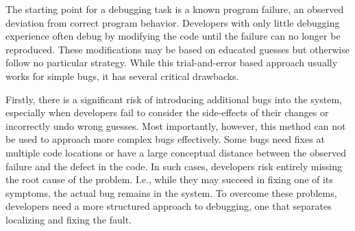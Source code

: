 The starting point for a debugging task is a known program failure, an observed deviation from correct program behavior.
Developers with only little debugging experience often debug by modifying the code until the failure can no longer be reproduced.
These modifications may be based on educated guesses but otherwise follow no particular strategy.
While this trial-and-error based approach usually works for simple bugs, it has several critical drawbacks.

Firstly, there is a significant risk of introducing additional bugs into the system, especially when developers fail to consider the side-effects of their changes or incorrectly undo wrong guesses.
Most importantly, however, this method can not be used to approach more complex bugs effectively.
Some bugs need fixes at multiple code locations or have a large conceptual distance between the observed failure and the defect in the code.
In such cases, developers risk entirely missing the root cause of the problem.
I.e., while they may succeed in fixing one of its symptoms, the actual bug remains in the system.
To overcome these problems, developers need a more structured approach to debugging, one that separates localizing and fixing the fault.

